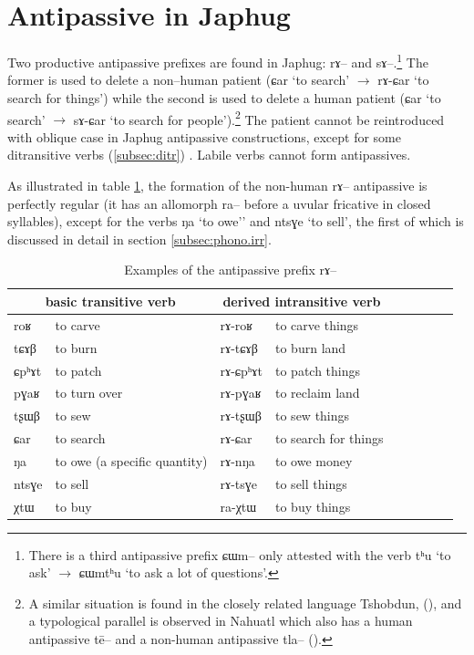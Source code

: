 \documentclass[oldfontcommands,oneside,a4paper,11pt]{article}
\newcommand{\ipa}[1]{{\phon \mbox{#1}}} %
\begin{document}
\section{Antipassive in Japhug} \label{sec:antipassive}
Two productive antipassive prefixes are found in Japhug: \ipa{rɤ}-- and \ipa{sɤ}--.\footnote{There is a third antipassive prefix \ipa{ɕɯm}-- only attested with the verb \ipa{tʰu} `to ask' $\rightarrow$ \ipa{ɕɯmtʰu} `to ask a lot of questions'. }  The former is used to delete a non--human patient (\ipa{ɕar} `to search' $\rightarrow$ \ipa{rɤ-ɕar} `to search for things') while the second is used to delete a human patient (\ipa{ɕar} `to search' $\rightarrow$ \ipa{sɤ-ɕar} `to search for people').\footnote{A similar situation is found in the closely related language Tshobdun, (\citealt[8]{jackson06paisheng}), and a typological parallel is observed in Nahuatl which also has a human antipassive \ipa{tē}-- and a non-human antipassive \ipa{tla}-- (\citealt[91]{creissels06sgit2}).}  The patient cannot be reintroduced with oblique case in Japhug antipassive constructions, except for some ditransitive verbs (\ref{subsec:ditr}) . Labile verbs cannot form antipassives.

As illustrated in table \ref{tab:antipassive.jpg}, the formation of the non-human \ipa{rɤ}-- antipassive is perfectly regular (it has an allomorph \ipa{ra}-- before a uvular fricative in closed syllables), except for the verbs \ipa{ŋa} `to owe'' and \ipa{ntsɣe} `to sell',   the first of which is discussed in detail  in section \ref{subsec:phono.irr}. %

\begin{table}[H]
\caption{Examples of the antipassive prefix  \ipa{rɤ}--} \label{tab:antipassive.jpg}
\begin{tabular}{lllllllll} \toprule
\multicolumn{2}{c}{basic  transitive verb}  & \multicolumn{2}{c}{derived  intransitive verb}  \\
\midrule
\ipa{roʁ}   &	to carve &  	\ipa{rɤ-roʁ}   &	to carve things \\  
\ipa{tɕɤβ}   &	to burn &  	\ipa{rɤ-tɕɤβ}   &	to burn land \\  
\ipa{ɕpʰɤt}   &	to patch &  	\ipa{rɤ-ɕpʰɤt}   &	to patch things \\  
\ipa{pɣaʁ}   &	to turn over &  	\ipa{rɤ-pɣaʁ}   &	to reclaim land \\  
\ipa{tʂɯβ}   &	to sew &  	\ipa{rɤ-tʂɯβ}   &	 to sew things \\   
\ipa{ɕar}   &	to search &  	\ipa{rɤ-ɕar}   &	to search for things \\ 
\ipa{ŋa}   &	to owe  (a specific quantity)&  	\ipa{rɤ-nŋa}   &	to owe money \\  
\ipa{ntsɣe}   &	to sell &  	\ipa{rɤ-tsɣe}   &	to sell things \\  
\ipa{χtɯ}   &	to buy &  	\ipa{ra-χtɯ}   &	to buy things \\  
\bottomrule
\end{tabular}
\end{table}
\end{document}
